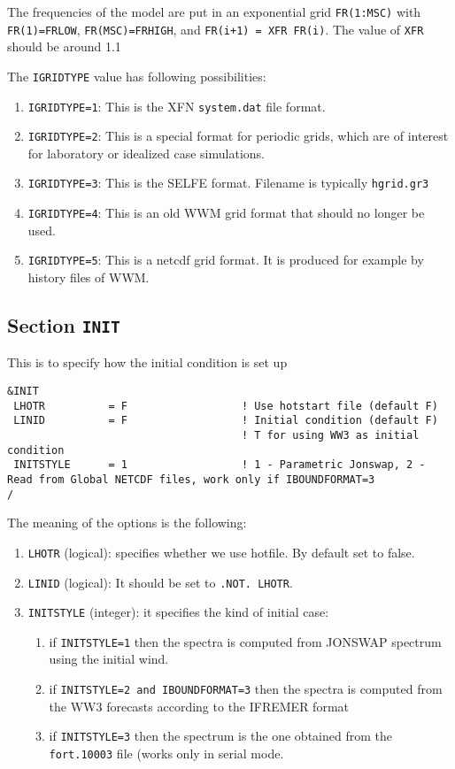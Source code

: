 \documentclass[12pt]{amsart}
\begin{document}
The frequencies of the model are put in an exponential grid {\tt FR(1:MSC)} with {\tt FR(1)=FRLOW}, {\tt FR(MSC)=FRHIGH}, and {\tt FR(i+1) = XFR FR(i)}. The value of {\tt XFR} should be around 1.1

The {\tt IGRIDTYPE} value has following possibilities:
\begin{enumerate}
\item {\tt IGRIDTYPE=1}: This is the XFN {\tt system.dat} file format.
\item {\tt IGRIDTYPE=2}: This is a special format for periodic grids, which are of interest for laboratory or idealized case simulations.
\item {\tt IGRIDTYPE=3}: This is the SELFE format. Filename is typically {\tt hgrid.gr3}
\item {\tt IGRIDTYPE=4}: This is an old WWM grid format that should no longer be used.
\item {\tt IGRIDTYPE=5}: This is a netcdf grid format. It is produced for example by history files of WWM.
\end{enumerate}




\subsection{Section {\tt INIT}}
This is to specify how the initial condition is set up
\begin{verbatim}
&INIT
 LHOTR          = F                  ! Use hotstart file (default F)
 LINID          = F                  ! Initial condition (default F)
                                     ! T for using WW3 as initial condition
 INITSTYLE      = 1                  ! 1 - Parametric Jonswap, 2 - Read from Global NETCDF files, work only if IBOUNDFORMAT=3
/
\end{verbatim}
The meaning of the options is the following:
\begin{enumerate}
\item {\tt LHOTR} (logical): specifies whether we use hotfile. By default set to false.
\item {\tt LINID} (logical): It should be set to {\tt .NOT. LHOTR}.
\item {\tt INITSTYLE} (integer): it specifies the kind of initial case:
  \begin{enumerate}
  \item if {\tt INITSTYLE=1} then the spectra is computed from JONSWAP spectrum using the initial wind.
  \item if {\tt INITSTYLE=2 and IBOUNDFORMAT=3} then the spectra is computed from the WW3 forecasts according to the IFREMER format
  \item if {\tt INITSTYLE=3} then the spectrum is the one obtained from the {\tt fort.10003} file (works only in serial mode.
  \end{enumerate}

  
\end{enumerate}
\end{document}
